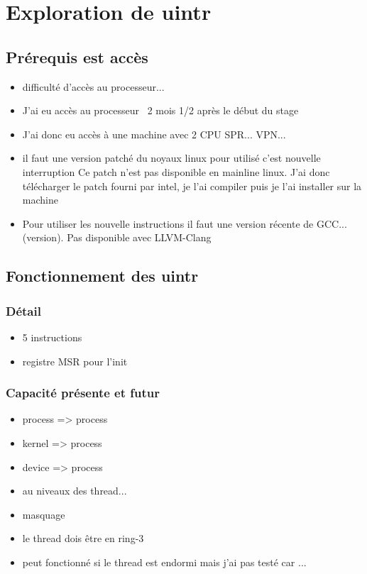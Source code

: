 \section{Exploration de uintr}

\subsection{Prérequis est accès}

\begin{itemize}
  \item difficulté d'accès au processeur...
  \item J'ai eu accès au processeur ~2 mois 1/2 après le début du stage
  \item J'ai donc eu accès à une machine avec 2 CPU SPR... VPN...
  \item il faut une version patché du noyaux linux pour utilisé c'est nouvelle interruption
  Ce patch n'est pas disponible en mainline linux.
  J'ai donc télécharger le patch fourni par intel, je l'ai compiler puis je l'ai installer sur la machine
  \item Pour utiliser les nouvelle instructions il faut une version récente de GCC... (version).
  Pas disponible avec LLVM-Clang
\end{itemize}

\subsection{Fonctionnement des uintr}

\subsubsection{Détail}

\begin{itemize}
  \item 5 instructions
  \item registre MSR pour l'init
\end{itemize}

\subsubsection{Capacité présente et futur}

\begin{itemize}
  \item process => process
  \item kernel => process
  \item device => process
  \item au niveaux des thread...
  \item masquage
  \item le thread dois être en ring-3
  \item peut fonctionné si le thread est endormi mais j'ai pas testé car ...
\end{itemize}

